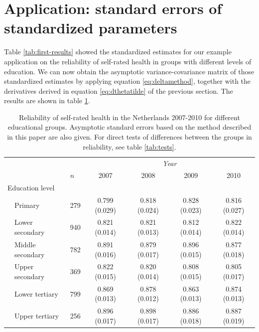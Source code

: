 \documentclass[a4paper,11pt]{article}
\newcommand{\0}{\boldsymbol{0}}
\begin{document}
\section{Application: standard errors of standardized parameters\label{sec:application}}

Table  \ref{tab:first-results} showed the standardized estimates for our example application on the
reliability of self-rated health in groups with different levels of education. We can now obtain the 
 asymptotic variance-covariance matrix of those standardized estimates 
by applying equation \ref{eq:deltamethod}, together with the derivatives derived in equation \ref{eq:dthetatilde} of the previous section. The results are shown in table \ref{tab:health-education}.

\begin{table}[tbh]
\begin{center}
\begin{tabular}{lllcccc}  \hline  \hline
&&&  \multicolumn{4}{c}{\emph{Year}}\\\cline{4-7}
&&$n$& 2007&2008&2009&2010\\
  \hline
  \multicolumn{2}{l}{Education level}\\
& Primary	   & 279  & 0.799 (0.029) & 0.818 (0.024) & 0.828 (0.023) & 0.816 (0.027) \\ 
& Lower secondary  & 940  & 0.821 (0.014) & 0.821 (0.013) & 0.812 (0.014) & 0.822 (0.014) \\ 
& Middle secondary & 782  & 0.891 (0.016) & 0.879 (0.017) & 0.896 (0.015) & 0.877 (0.018) \\ 
& Upper secondary  & 369  & 0.822 (0.015) & 0.820 (0.014) & 0.808 (0.015) & 0.805 (0.017) \\ 
& Lower tertiary   & 799  & 0.869 (0.013) & 0.878 (0.012) & 0.863 (0.013) & 0.874 (0.013) \\ 
& Upper tertiary   & 256  & 0.896 (0.017) & 0.898 (0.017) & 0.886 (0.018) & 0.887 (0.019) \\ 
  \hline     \hline
\end{tabular}
\caption{Reliability of self-rated health in the Netherlands 2007-2010 for different educational groups. 
Asymptotic standard errors based on the method described in this paper are also given. For direct tests of 
differences between the groups in reliability, see table \ref{tab:tests}.}\label{tab:health-education}
\end{center}
\end{table}
\end{document}
